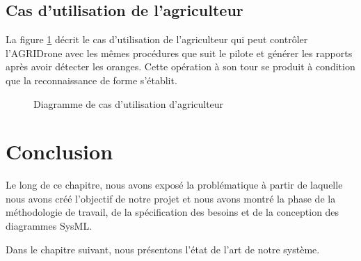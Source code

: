 		\subsection{Cas d'utilisation de l'agriculteur }
		La figure \ref{fig:D.A} décrit le cas d'utilisation de l'agriculteur qui peut contrôler l'AGRIDrone avec les mêmes procédures que suit le pilote et générer les rapports après avoir détecter les oranges. Cette opération à son tour se produit à condition que la reconnaissance de forme s'établit. 
		\begin{figure}[H] 
			\begin{center} 
				\centering
				\hspace*{-0.7cm}	
			\end{center}
			
			\caption{\label{fig:D.A}Diagramme de cas d'utilisation d'agriculteur}	
			
			\end {figure}
			
			\section*{Conclusion}
			Le long de ce chapitre, nous avons exposé la problématique à partir de laquelle nous avons créé l'objectif de notre projet et nous avons montré la phase de la méthodologie de travail, de la spécification des besoins et de la conception des diagrammes SysML.
			
			Dans le chapitre suivant, nous présentons l'état de l'art de notre système.
			


